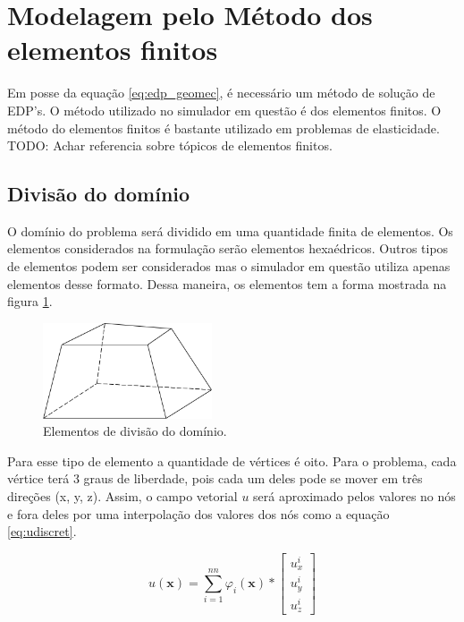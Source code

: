 \section{Modelagem pelo Método dos elementos finitos}

Em posse da equação \ref{eq:edp_geomec}, é necessário um método de solução de EDP's. O método utilizado no simulador em questão é dos elementos finitos. O método do elementos finitos é bastante utilizado em problemas de elasticidade. {\color{red}TODO: Achar referencia sobre tópicos de elementos finitos.}


\subsection{Divisão do domínio}

O domínio do problema será dividido em uma quantidade finita de elementos. Os elementos considerados na formulação serão elementos hexaédricos. Outros tipos de elementos podem ser considerados mas o simulador em questão utiliza apenas elementos desse formato. Dessa maneira, os elementos tem a forma mostrada na figura \ref{fig:elemento}.


\begin{figure}[!htbp]
\label{fig:elemento}
\centering
\includegraphics[width=5cm]{chap01/elemento_original.png}
\caption{Elementos de divisão do domínio.}
\end{figure}

Para esse tipo de elemento a quantidade de vértices é oito. Para o problema, cada vértice terá 3 graus de liberdade, pois cada um deles pode se mover em três direções (x, y, z). Assim, o campo vetorial $u$ será aproximado pelos valores no nós e fora deles por uma interpolação dos valores dos nós como a equação \ref{eq:udiscret}.


\begin{equation}\label{eq:udiscret}
u(\mathbf{x}) = \sum_{i=1}^{nn} \varphi_i(\mathbf{x}) * \begin{bmatrix}
u^i_x \\ u^i_y \\ u^i_z
\end{bmatrix}
\end{equation}

